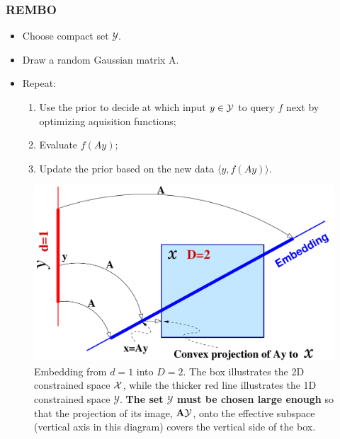 \documentclass[grey]{beamer}
\begin{document}
 \begin{frame}
  \frametitle{REMBO}
  \begin{itemize}
   \item Choose compact set {\bf \textcolor{myColor}{$\mathcal{Y}$}}.
   \item Draw a random Gaussian matrix A.
   \item Repeat:
   \begin{enumerate}
    \item Use the prior to decide at which input $y \in \cal Y$ to query $f$ next
    by optimizing aquisition functions;
    \item Evaluate {\bf \textcolor{myColor}{$f(Ay)$}};
    \item Update the prior based on the new data 
    {\bf \textcolor{myColor}{$\langle{}y, f(Ay)\rangle$}}.
   \end{enumerate}
  \end{itemize}
 \end{frame}

 \begin{frame}
  \begin{figure}[t!]
\centering
  \includegraphics[scale=0.28]{../paper/figures/projection.pdf}
  \caption{Embedding from $d=1$ into $D=2$. The box illustrates the 2D constrained space ${\cal X}$, while the thicker red line illustrates the 1D constrained space $\mathcal{Y}$. {\bf \textcolor{myColor}{The set $\mathcal{Y}$ must be chosen large enough}} so that the projection of its image, $\mathbf{A} \mathcal{Y}$, onto the effective subspace (vertical axis in this diagram) covers the vertical side of the box.}
  \label{fig:proj}
  \vspace{-1em}
\end{figure}
 \end{frame}
 
\end{document}

